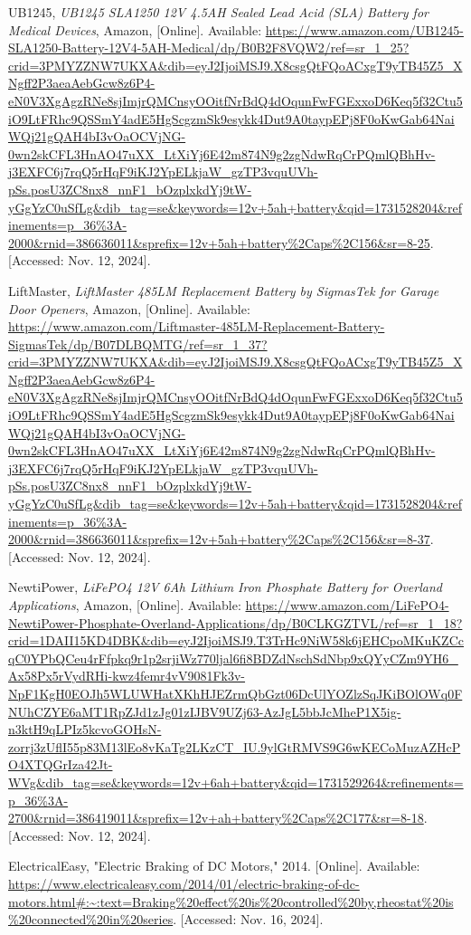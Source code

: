 \begin{thebibliography}{45}
	UB1245, \textit{UB1245 SLA1250 12V 4.5AH Sealed Lead Acid (SLA) Battery for Medical Devices}, Amazon, [Online]. Available: \url{https://www.amazon.com/UB1245-SLA1250-Battery-12V4-5AH-Medical/dp/B0B2F8VQW2/ref=sr_1_25?crid=3PMYZZNW7UKXA&dib=eyJ2IjoiMSJ9.X8csgQtFQoACxgT9yTB45Z5_XNgff2P3aeaAebGcw8z6P4-eN0V3XgAgzRNe8sjImjrQMCnsyOOitfNrBdQ4dOqunFwFGExxoD6Keq5f32Ctu5iO9LtFRhc9QSSmY4adE5HgScgzmSk9esykk4Dut9A0taypEPj8F0oKwGab64NaiWQj21gQAH4bI3vOaOCVjNG-0wn2skCFL3HnAO47uXX_LtXiYj6E42m874N9g2zgNdwRqCrPQmlQBhHv-j3EXFC6j7rqQ5rHqF9iKJ2YpELkjaW_gzTP3vquUVh-pSs.posU3ZC8nx8_nnF1_bOzplxkdYj9tW-yGgYzC0uSfLg&dib_tag=se&keywords=12v+5ah+battery&qid=1731528204&refinements=p_36%3A-2000&rnid=386636011&sprefix=12v+5ah+battery%2Caps%2C156&sr=8-25}. [Accessed: Nov. 12, 2024].
	
	LiftMaster, \textit{LiftMaster 485LM Replacement Battery by SigmasTek for Garage Door Openers}, Amazon, [Online]. Available: \url{https://www.amazon.com/Liftmaster-485LM-Replacement-Battery-SigmasTek/dp/B07DLBQMTG/ref=sr_1_37?crid=3PMYZZNW7UKXA&dib=eyJ2IjoiMSJ9.X8csgQtFQoACxgT9yTB45Z5_XNgff2P3aeaAebGcw8z6P4-eN0V3XgAgzRNe8sjImjrQMCnsyOOitfNrBdQ4dOqunFwFGExxoD6Keq5f32Ctu5iO9LtFRhc9QSSmY4adE5HgScgzmSk9esykk4Dut9A0taypEPj8F0oKwGab64NaiWQj21gQAH4bI3vOaOCVjNG-0wn2skCFL3HnAO47uXX_LtXiYj6E42m874N9g2zgNdwRqCrPQmlQBhHv-j3EXFC6j7rqQ5rHqF9iKJ2YpELkjaW_gzTP3vquUVh-pSs.posU3ZC8nx8_nnF1_bOzplxkdYj9tW-yGgYzC0uSfLg&dib_tag=se&keywords=12v+5ah+battery&qid=1731528204&refinements=p_36%3A-2000&rnid=386636011&sprefix=12v+5ah+battery%2Caps%2C156&sr=8-37}. [Accessed: Nov. 12, 2024].
	
	NewtiPower, \textit{LiFePO4 12V 6Ah Lithium Iron Phosphate Battery for Overland Applications}, Amazon, [Online]. Available: \url{https://www.amazon.com/LiFePO4-NewtiPower-Phosphate-Overland-Applications/dp/B0CLKGZTVL/ref=sr_1_18?crid=1DAII15KD4DBK&dib=eyJ2IjoiMSJ9.T3TrHc9NiW58k6jEHCpoMKuKZCcqC0YPbQCeu4rFfpkq9r1p2srjiWz770ljal6fi8BDZdNschSdNbp9xQYyCZm9YH6_Ax58Px5rVydRHi-kwz4femr4vV9081Fk3v-NpF1KgH0EOJh5WLUWHatXKhHJEZrmQbGzt06DcUlYOZlzSqJKiBOlOWq0FNUhCZYE6aMT1RpZJd1zJg01zIJBV9UZj63-AzJgL5bbJcMheP1X5ig-n3ktH9qLPIz5kcvoGOHsN-zorrj3zUflI55p83M13lEo8vKaTg2LKzCT_IU.9ylGtRMVS9G6wKECoMuzAZHcPO4XTQGrIza42Jt-WVg&dib_tag=se&keywords=12v+6ah+battery&qid=1731529264&refinements=p_36%3A-2700&rnid=386419011&sprefix=12v+ah+battery%2Caps%2C177&sr=8-18}. [Accessed: Nov. 12, 2024].
	
	 ElectricalEasy, "Electric Braking of DC Motors," 2014. [Online]. Available: \url{https://www.electricaleasy.com/2014/01/electric-braking-of-dc-motors.html#:~:text=Braking%20effect%20is%20controlled%20by,rheostat%20is%20connected%20in%20series}. [Accessed: Nov. 16, 2024]. 
	

\end{thebibliography}
